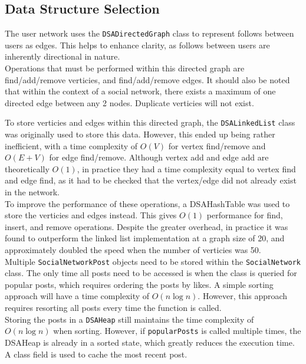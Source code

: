 \documentclass{article}
\begin{document}
\subsection{Data Structure Selection}

The user network uses the \texttt{DSADirectedGraph} class to represent follows between users
as edges. This helps to enhance clarity, as follows between users are inherently directional in nature.\\

Operations that must be performed within this directed graph are find/add/remove verticies,
and find/add/remove edges. It should also be noted that within the context of a social network,
there exists a maximum of one directed edge between any 2 nodes. Duplicate verticies will not exist.

To store verticies and edges within this directed graph, the \texttt{DSALinkedList} class was originally
used to store this data. However, this ended up being rather inefficient, with a time complexity of
$O\left(V\right)$ for vertex find/remove and $O\left(E + V\right)$ for edge find/remove.
Although vertex add and edge add are theoretically $O\left(1\right)$, in practice they had a time complexity
equal to vertex find and edge find, as it had to be checked that the vertex/edge did not already exist in the network.\\

To improve the performance of these operations, a DSAHashTable was used to store the verticies and edges instead.
This gives $O\left(1\right)$
performance for find, insert, and remove operations. Despite the greater overhead, in practice it was found to outperform
the linked list implementation at a graph size of 20, and approximately doubled the speed when the number of verticies was 50.\\

Multiple \texttt{SocialNetworkPost} objects need to be stored within the \texttt{SocialNetwork} class.
The only time all posts need to be accessed
is when the class is queried for popular posts, which requires ordering the posts by likes.
A simple sorting approach will have a time complexity of $O\left(n\log n\right)$. However, this
approach requires resorting all posts every time the function is called.\\

Storing the posts in a \texttt{DSAHeap} still maintains
the time complexity of $O\left(n\log n\right)$ when sorting. However, if \texttt{popularPosts}
is called multiple times, the DSAHeap is already in a sorted state, which greatly reduces the execution time.
A class field is used to cache the most recent post.\\
\end{document}
